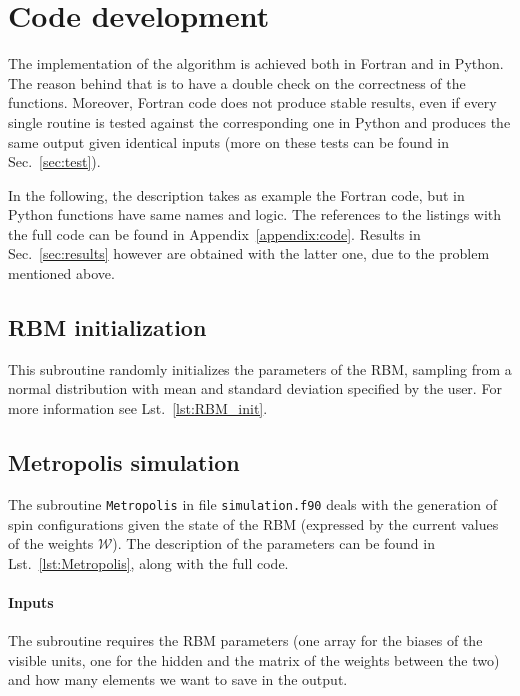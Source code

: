 \documentclass[a4paper,11pt]{article}
\begin{document}
\section{Code development}

The implementation of the algorithm is achieved both in Fortran and in Python. The reason behind that is to have a double check on the correctness of the functions. Moreover, Fortran code does not produce stable results, even if every single routine is tested against the corresponding one in Python and produces the same output given identical inputs (more on these tests can be found in Sec.~\ref{sec:test}).

In the following, the description takes as example the Fortran code, but in Python functions have same names and logic. The references to the listings with the full code can be found in Appendix~\ref{appendix:code}. Results in Sec.~\ref{sec:results} however are obtained with the latter one, due to the problem mentioned above.


\subsection{RBM initialization}
This subroutine randomly initializes the parameters of the RBM, sampling from a normal distribution with mean and standard deviation specified by the user. For more information see Lst.~\ref{lst:RBM_init}.


\subsection{Metropolis simulation}
\label{sec:Metropolis}

The subroutine \texttt{Metropolis} in file \texttt{simulation.f90} deals with the generation of spin configurations given the state of the RBM (expressed by the current values of the weights $\mathcal{W}$). The description of the parameters can be found in Lst.~\ref{lst:Metropolis}, along with the full code. 

\paragraph{Inputs}
The subroutine requires the RBM parameters (one array for the biases of the visible units, one for the hidden and the matrix of the weights between the two) and how many elements we want to save in the output.
\end{document}
